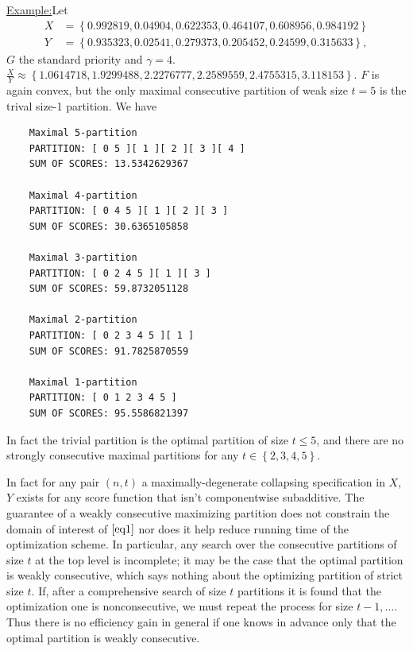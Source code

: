 \documentclass{article}
\theoremstyle{case}
\newenvironment{example}[1]{\par\noindent\underline{Example:}\space#1}{}
\begin{document}
\begin{example}
Let 
\begin{align*}
X & = \left\lbrace 0.992819, 0.04904, 0.622353, 0.464107, 0.608956, 0.984192 \right\rbrace \\
Y & = \left\lbrace 0.935323, 0.02541, 0.279373, 0.205452, 0.24599, 0.315633 \right\rbrace,
\end{align*}
$G$ the standard priority and $\gamma = 4$. $\frac{X}{Y} \approx \left\lbrace 1.0614718, 1.9299488, 2.2276777, 2.2589559, 2.4755315, 3.118153 \right\rbrace$. $F$ is again convex, but the only maximal consecutive partition of weak size $t = 5$ is the trival size-1 partition. We have

\begin{verbatim}
    Maximal 5-partition
    PARTITION: [ 0 5 ][ 1 ][ 2 ][ 3 ][ 4 ]
    SUM OF SCORES: 13.5342629367

    Maximal 4-partition
    PARTITION: [ 0 4 5 ][ 1 ][ 2 ][ 3 ]
    SUM OF SCORES: 30.6365105858

    Maximal 3-partition
    PARTITION: [ 0 2 4 5 ][ 1 ][ 3 ]
    SUM OF SCORES: 59.8732051128

    Maximal 2-partition
    PARTITION: [ 0 2 3 4 5 ][ 1 ]
    SUM OF SCORES: 91.7825870559

    Maximal 1-partition
    PARTITION: [ 0 1 2 3 4 5 ]
    SUM OF SCORES: 95.5586821397
\end{verbatim}
In fact the trivial partition is the optimal partition of size $t \leq 5$, and there are no strongly consecutive maximal partitions for any $t \in \left\lbrace 2, 3, 4, 5\right\rbrace$.

\end{example}

In fact for any pair $\left( n, t\right)$ a maximally-degenerate collapsing specification in $X$, $Y$ exists for any score function that isn't componentwise subadditive. The guarantee of a weakly consecutive maximizing partition does not constrain the domain of interest of $\cite{eq1}$ nor does it help reduce running time of the optimization scheme. In particular, any search over the consecutive partitions of size $t$ at the top level is incomplete; it may be the case that the optimal partition is weakly consecutive, which says nothing about the optimizing partition of strict size $t$. If, after a comprehensive search of size $t$ partitions it is found that the optimization one is nonconsecutive, we must repeat the process for size $t-1, \dots$. Thus there is no efficiency gain in general if one knows in advance only that the optimal partition is weakly consecutive. 
\end{document}
